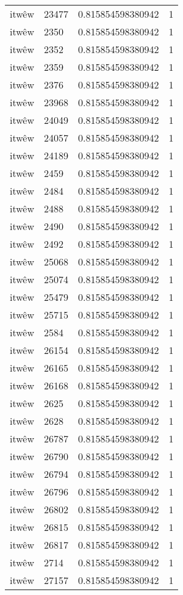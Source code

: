 \begin{longtable}{llll}
itwêw & 23477 & 0.815854598380942 & 1 \\
itwêw & 2350 & 0.815854598380942 & 1 \\
itwêw & 2352 & 0.815854598380942 & 1 \\
itwêw & 2359 & 0.815854598380942 & 1 \\
itwêw & 2376 & 0.815854598380942 & 1 \\
itwêw & 23968 & 0.815854598380942 & 1 \\
itwêw & 24049 & 0.815854598380942 & 1 \\
itwêw & 24057 & 0.815854598380942 & 1 \\
itwêw & 24189 & 0.815854598380942 & 1 \\
itwêw & 2459 & 0.815854598380942 & 1 \\
itwêw & 2484 & 0.815854598380942 & 1 \\
itwêw & 2488 & 0.815854598380942 & 1 \\
itwêw & 2490 & 0.815854598380942 & 1 \\
itwêw & 2492 & 0.815854598380942 & 1 \\
itwêw & 25068 & 0.815854598380942 & 1 \\
itwêw & 25074 & 0.815854598380942 & 1 \\
itwêw & 25479 & 0.815854598380942 & 1 \\
itwêw & 25715 & 0.815854598380942 & 1 \\
itwêw & 2584 & 0.815854598380942 & 1 \\
itwêw & 26154 & 0.815854598380942 & 1 \\
itwêw & 26165 & 0.815854598380942 & 1 \\
itwêw & 26168 & 0.815854598380942 & 1 \\
itwêw & 2625 & 0.815854598380942 & 1 \\
itwêw & 2628 & 0.815854598380942 & 1 \\
itwêw & 26787 & 0.815854598380942 & 1 \\
itwêw & 26790 & 0.815854598380942 & 1 \\
itwêw & 26794 & 0.815854598380942 & 1 \\
itwêw & 26796 & 0.815854598380942 & 1 \\
itwêw & 26802 & 0.815854598380942 & 1 \\
itwêw & 26815 & 0.815854598380942 & 1 \\
itwêw & 26817 & 0.815854598380942 & 1 \\
itwêw & 2714 & 0.815854598380942 & 1 \\
itwêw & 27157 & 0.815854598380942 & 1 \\

\end{longtable}
